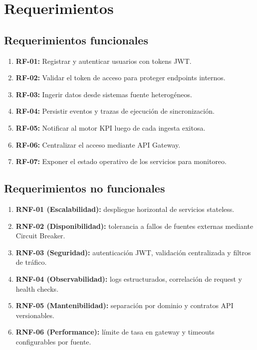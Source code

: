 \documentclass[12pt,a4paper]{article}
\begin{document}
\newpage
\section{Requerimientos}

\subsection{Requerimientos funcionales}
\begin{enumerate}[leftmargin=1.2cm]
  \item \textbf{RF-01:} Registrar y autenticar usuarios con tokens JWT.
  \item \textbf{RF-02:} Validar el token de acceso para proteger endpoints internos.
  \item \textbf{RF-03:} Ingerir datos desde sistemas fuente heterogéneos.
  \item \textbf{RF-04:} Persistir eventos y trazas de ejecución de sincronización.
  \item \textbf{RF-05:} Notificar al motor KPI luego de cada ingesta exitosa.
  \item \textbf{RF-06:} Centralizar el acceso mediante API Gateway.
  \item \textbf{RF-07:} Exponer el estado operativo de los servicios para monitoreo.
\end{enumerate}

\subsection{Requerimientos no funcionales}
\begin{enumerate}[leftmargin=1.2cm]
  \item \textbf{RNF-01 (Escalabilidad):} despliegue horizontal de servicios stateless.
  \item \textbf{RNF-02 (Disponibilidad):} tolerancia a fallos de fuentes externas mediante Circuit Breaker.
  \item \textbf{RNF-03 (Seguridad):} autenticación JWT, validación centralizada y filtros de tráfico.
  \item \textbf{RNF-04 (Observabilidad):} logs estructurados, correlación de request y health checks.
  \item \textbf{RNF-05 (Mantenibilidad):} separación por dominio y contratos API versionables.
  \item \textbf{RNF-06 (Performance):} límite de tasa en gateway y timeouts configurables por fuente.
\end{enumerate}
\end{document}
